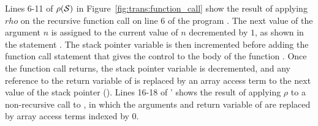 Lines 6-11 of $\rho(\mathcal{S})$ in Figure~\ref{fig:trans:function_call} show the 
result of applying $rho$ on the recursive function call 
on line 6 of the program \Pm. The next value of the argument $n$ is assigned
to the current value of $n$ decremented by $1$, as shown in the statement
. The stack pointer variable
is then incremented before adding the function call statement 
that gives the control to the body of the function . Once the function
call returns, the stack pointer variable is decremented, and any reference
to the return variable of  is replaced by an array access term to the 
next value of the stack pointer ().
Lines 16-18 of \Pm' shows the result of applying $\rho$ to a non-recursive call
to , in which the arguments and return variable of  are 
replaced by array access terms indexed by $0$.
%
%
